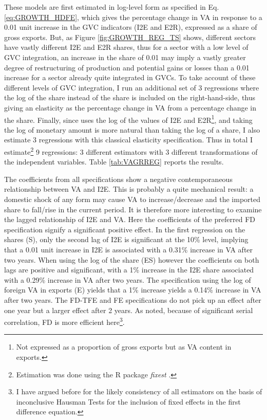 \documentclass[a4paper]{article}
\begin{document}
These models are first estimated in log-level form as specified in Eq. \ref{eq:GROWTH_HDFE}, which gives the percentage change in VA in response to a 0.01 unit increase in the GVC indicators (I2E and E2R), expressed as a share of gross exports. But, as Figure \ref{fig:GROWTH_REG_TS} shows, different sectors have vastly different I2E and E2R shares, thus for a sector with a low level of GVC integration, an increase in the share of 0.01 may imply a vastly greater degree of restructuring of production and potential gains or losses than a 0.01 increase for a sector already quite integrated in GVCs. To take account of these different levels of GVC integration, I run an additional set of 3 regressions where the log of the share instead of the share is included on the right-hand-side, thus giving an elasticity as the percentage change in VA from a percentage change in the share. Finally, since \citet{Kummritz20161} uses the log of the values of I2E and E2R\footnote{Not expressed as a proportion of gross exports but as VA content in exports.}, and taking the log of monetary amount is more natural than taking the log of a share, I also estimate 3 regressions with this classical elasticity specification. Thus in total I estimate\footnote{Estimation was done using the R package \textit{fixest} \citep{fixest2018}.} 9 regressions: 3 different estimators with 3 different transformations of the independent variables. Table \ref{tab:VAGRREG} reports the results. \newline 

The coefficients from all specifications show a negative contemporaneous relationship between VA and I2E. This is probably a quite mechanical result: a domestic shock of any form may cause VA to increase/decrease and the imported share to fall/rise in the current period. It is therefore more interesting to examine the lagged relationship of I2E and VA. Here the coefficients of the preferred FD specification signify a significant positive effect. In the first regression on the shares (S), only the second lag of I2E is significant at the 10\% level, implying that a 0.01 unit increase in I2E is associated with a 0.31\% increase in VA after two years. When using the log of the share (ES) however the coefficients on both lags are positive and significant, with a 1\% increase in the I2E share associated with a  0.29\% increase in VA after two years. The specification using the log of foreign VA in exports (E) yields that a 1\% increase yields a 0.14\% increase in VA after two years. The FD-TFE and FE specifications do not pick up an effect after one year but a larger effect after 2 years. As noted, because of significant serial correlation, FD is more efficient here\footnote{I have argued before for the likely consistency of all estimators on the basis of inconclusive Hausman Tests for the inclusion of fixed effects in the first difference equation.}. \newline    %
\end{document}

